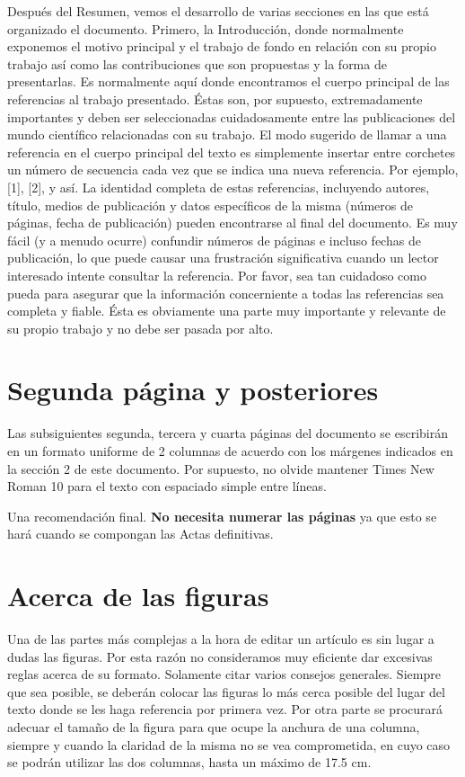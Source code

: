 \documentclass[10pt,a4paper,twoside]{article}
\begin{document}
\begin{multicols}{2}
    Después del Resumen, vemos el desarrollo de varias secciones en las que está organizado el documento. Primero, la Introducción, donde normalmente exponemos el motivo principal y el trabajo de fondo en relación con su propio trabajo así como las contribuciones que son propuestas y la forma de presentarlas. Es normalmente aquí donde encontramos el cuerpo principal de las referencias al trabajo presentado. Éstas son, por supuesto, extremadamente importantes y deben ser seleccionadas cuidadosamente entre las publicaciones del mundo científico relacionadas con su trabajo. El modo sugerido de llamar a una referencia en el cuerpo principal del texto es simplemente insertar entre corchetes un número de secuencia cada vez que se indica una nueva referencia. Por ejemplo, [1], [2], y así. La identidad completa de estas referencias, incluyendo autores, título, medios de publicación y datos específicos de la misma (números de páginas, fecha de publicación) pueden encontrarse al final del documento. Es muy fácil (y a menudo ocurre) confundir números de páginas e incluso fechas de publicación, lo que puede causar una frustración significativa cuando un lector interesado intente consultar la referencia. Por favor, sea tan cuidadoso como pueda para asegurar que la información concerniente a todas las referencias sea completa  y fiable. Ésta es obviamente una parte muy importante y relevante de su propio trabajo y no debe ser pasada por alto.

    \section{Segunda página y posteriores}

    Las subsiguientes segunda, tercera y cuarta páginas del documento se escribirán en un formato uniforme de 2 columnas de acuerdo con los márgenes indicados en la sección 2 de este documento. Por supuesto, no olvide mantener Times New Roman 10 para el texto con espaciado simple entre líneas.

    Una recomendación final. \textbf{No necesita numerar las páginas} ya que esto se hará cuando se compongan las Actas definitivas.

    \section{Acerca de las figuras}

    Una de las partes más complejas a la hora de editar un artículo es sin lugar a dudas las figuras. Por esta razón no consideramos muy eficiente dar excesivas reglas acerca de su formato. Solamente citar varios consejos generales. Siempre que sea posible, se deberán colocar las figuras lo más cerca posible del lugar del texto donde se les haga referencia por primera vez. Por otra parte se procurará adecuar el tamaño de la figura para que ocupe la anchura de una columna, siempre y cuando la claridad de la misma no se vea comprometida, en cuyo caso se podrán utilizar las dos columnas, hasta un máximo de 17.5 cm.


\end{multicols}
\end{document}
